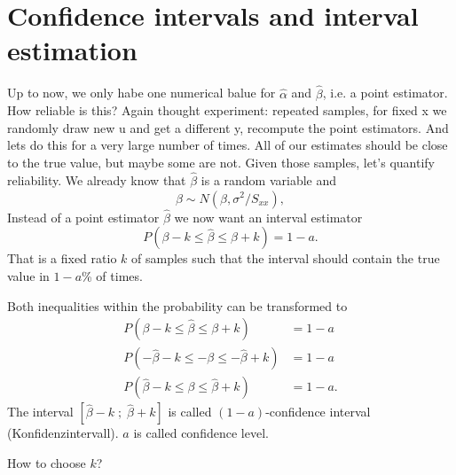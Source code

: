 \documentclass{article}
\begin{document}
\section{Confidence intervals and interval estimation}
Up to now, we only habe one numerical balue for $\hat{\alpha}$ and $\hat{\beta}$, i.e. a point estimator. How reliable is this? Again thought experiment: repeated samples, for fixed x we randomly draw new u and get a different y, recompute the point estimators. And lets do this for a very large number of times. All of our estimates should be close to the true value, but maybe some are not. Given those samples, let's quantify reliability.
We already know that $\hat{\beta}$ is a random variable and%
\[ \hat{\beta}\sim N\left( \beta ,\sigma ^{2}/S_{xx}\right), \]
Instead of a point estimator $\hat{\beta}$ we now want an interval
estimator
\[ P(\beta-k\le \hat\beta\le \beta+k)=1-a.\]
That is a fixed ratio $k$ of samples such that the interval should contain the true value in $1-a$\% of times.

Both inequalities within the probability can be transformed to
\begin{align*}
P(\beta-k\le \hat\beta\le \beta+k)&=1-a \\
P(-\hat\beta-k\le -\beta\le -\hat\beta+k)&=1-a \\
P(\hat\beta-k\le \beta\le \hat\beta+k)&=1-a.
\end{align*}
The interval $[\hat{\beta}-k\;;\;\hat{\beta}+k]$ is called $\left(
1-a\right) $-confidence interval (Konfidenzintervall).  $a$ is called confidence level.
\begin{center}
	
\end{center}

How to choose $k$?
\end{document}
